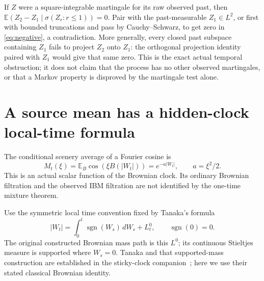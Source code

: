 \documentclass[11pt]{article}
\newcommand{\E}{\mathbb E}
\begin{document}
If $Z$ were a square-integrable martingale for its raw observed past,
then $\E(Z_2-Z_1\mid\sigma(Z_r:r\leq1))=0$.
Pair with the past-measurable $Z_1\in L^2$, or first with bounded
truncations and pass by Cauchy--Schwarz, to get zero in
\eqref{eq:negative}, a contradiction. More generally, every closed
past subspace containing $Z_1$ fails to project $Z_2$ onto $Z_1$:
the orthogonal projection identity paired with $Z_1$ would give
that same zero. This is the exact actual temporal obstruction;
it does not claim that the process has no other observed martingales,
or that a Markov property is disproved by the martingale test alone.

\section{A source mean has a hidden-clock local-time formula}
The conditional scenery average of a Fourier cosine is
\[
 M_t(\xi)=\E_B\cos(\xi B(|W_t|))
         =e^{-a|W_t|},\qquad a=\xi^2/2.
\]
This is an actual scalar function of the Brownian clock. Its ordinary
Brownian filtration and the observed IBM filtration are not identified
by the one-time mixture theorem.

Use the symmetric local time convention fixed by Tanaka's formula
\[
 |W_t|=\int_0^t\operatorname{sgn}(W_s)\,dW_s+L_t^0,
 \qquad \operatorname{sgn}(0)=0.
\]
The original constructed Brownian mass path is this $L^0$; its
continuous Stieltjes measure is supported where $W_s=0$.
Tanaka and that supported-mass construction are established in the
sticky-clock companion~\cite{sticky}; here we use their stated
classical Brownian identity.
\end{document}
